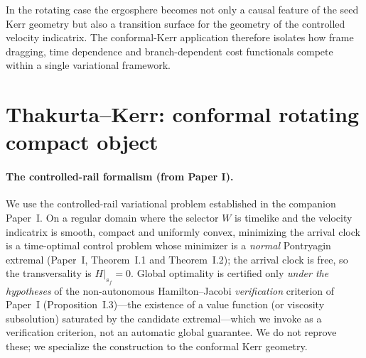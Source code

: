 \documentclass[12pt]{iopart}
\theoremstyle{plain}
\theoremstyle{definition}
\theoremstyle{remark}
\begin{document}
In the rotating case the ergosphere becomes not only a causal feature of the seed Kerr
geometry but also a transition surface for the geometry of the controlled velocity
indicatrix. The conformal-Kerr application therefore isolates how frame dragging, time
dependence and branch-dependent cost functionals compete within a single variational
framework.

\section{Thakurta--Kerr: conformal rotating compact object}
\label{sec:thakurta}
\paragraph{The controlled-rail formalism (from Paper I).} We use the controlled-rail
variational problem established in the companion Paper~I. On a regular domain where the
selector $W$ is timelike and the velocity indicatrix is smooth, compact and uniformly
convex, minimizing the arrival clock is a time-optimal control problem whose minimizer is
a \emph{normal} Pontryagin extremal (Paper~I, Theorem~I.1 and Theorem~I.2); the arrival
clock is free, so the transversality is $H|_{s_f}=0$. Global optimality is certified only
\emph{under the hypotheses} of the non-autonomous Hamilton--Jacobi \emph{verification}
criterion of Paper~I (Proposition~I.3)---the existence of a value function (or viscosity
subsolution) saturated by the candidate extremal---which we invoke as a verification
criterion, not an automatic global guarantee. We do not reprove these; we specialize the
construction to the conformal Kerr geometry.
\end{document}
